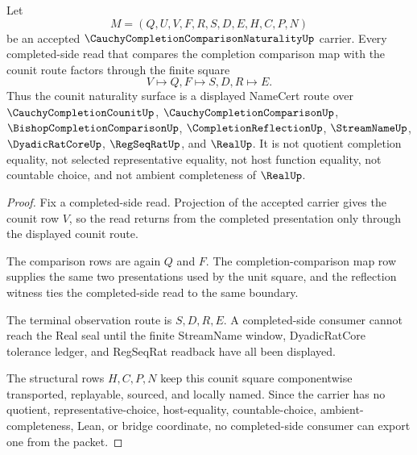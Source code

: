 \begin{theorem}
\label{thm:cauchy-completion-comparison-naturality-counit-square}
Let
$$
M=(Q,U,V,F,R,S,D,E,H,C,P,N)
$$
be an accepted $\CauchyCompletionComparisonNaturalityUp$ carrier. Every completed-side read that compares the completion comparison map with the counit route factors through the finite square
$$
V \longmapsto Q,F \longmapsto S,D,R \longmapsto E .
$$
Thus the counit naturality surface is a displayed NameCert route over $\CauchyCompletionCounitUp$, $\CauchyCompletionComparisonUp$, $\BishopCompletionComparisonUp$, $\CompletionReflectionUp$, $\StreamNameUp$, $\DyadicRatCoreUp$, $\RegSeqRatUp$, and $\RealUp$. It is not quotient completion equality, not selected representative equality, not host function equality, not countable choice, and not ambient completeness of $\RealUp$.
\end{theorem}
\begin{proof}
Fix a completed-side read. Projection of the accepted carrier gives the counit row $V$, so the read returns from the completed presentation only through the displayed counit route.

The comparison rows are again $Q$ and $F$. The completion-comparison map row supplies the same two presentations used by the unit square, and the reflection witness ties the completed-side read to the same boundary.

The terminal observation route is $S,D,R,E$. A completed-side consumer cannot reach the Real seal until the finite StreamName window, DyadicRatCore tolerance ledger, and RegSeqRat readback have all been displayed.

The structural rows $H,C,P,N$ keep this counit square componentwise transported, replayable, sourced, and locally named. Since the carrier has no quotient, representative-choice, host-equality, countable-choice, ambient-completeness, Lean, or bridge coordinate, no completed-side consumer can export one from the packet.
\end{proof}

